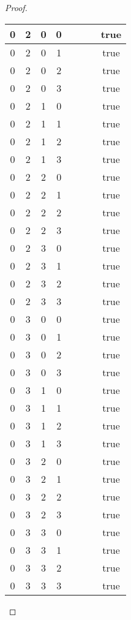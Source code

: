 \documentclass[10pt]{article}
\theoremstyle{definition}
\theoremstyle{plain}
\begin{document}
\begin{proof}
\begin{longtable}{|c|c|c|c|c|c|c|c|}
      0 & 2 & 0 & 0 &  &  &  & true \tabularnewline \hline
      0 & 2 & 0 & 1 &  &  &  & true \tabularnewline \hline
      0 & 2 & 0 & 2 &  &  &  & true \tabularnewline \hline
      0 & 2 & 0 & 3 &  &  &  & true \tabularnewline \hline
      0 & 2 & 1 & 0 &  &  &  & true \tabularnewline \hline
      0 & 2 & 1 & 1 &  &  &  & true \tabularnewline \hline
      0 & 2 & 1 & 2 &  &  &  & true \tabularnewline \hline
      0 & 2 & 1 & 3 &  &  &  & true \tabularnewline \hline
      0 & 2 & 2 & 0 &  &  &  & true \tabularnewline \hline
      0 & 2 & 2 & 1 &  &  &  & true \tabularnewline \hline
      0 & 2 & 2 & 2 &  &  &  & true \tabularnewline \hline
      0 & 2 & 2 & 3 &  &  &  & true \tabularnewline \hline
      0 & 2 & 3 & 0 &  &  &  & true \tabularnewline \hline
      0 & 2 & 3 & 1 &  &  &  & true \tabularnewline \hline
      0 & 2 & 3 & 2 &  &  &  & true \tabularnewline \hline
      0 & 2 & 3 & 3 &  &  &  & true \tabularnewline \hline
      0 & 3 & 0 & 0 &  &  &  & true \tabularnewline \hline
      0 & 3 & 0 & 1 &  &  &  & true \tabularnewline \hline
      0 & 3 & 0 & 2 &  &  &  & true \tabularnewline \hline
      0 & 3 & 0 & 3 &  &  &  & true \tabularnewline \hline
      0 & 3 & 1 & 0 &  &  &  & true \tabularnewline \hline
      0 & 3 & 1 & 1 &  &  &  & true \tabularnewline \hline
      0 & 3 & 1 & 2 &  &  &  & true \tabularnewline \hline
      0 & 3 & 1 & 3 &  &  &  & true \tabularnewline \hline
      0 & 3 & 2 & 0 &  &  &  & true \tabularnewline \hline
      0 & 3 & 2 & 1 &  &  &  & true \tabularnewline \hline
      0 & 3 & 2 & 2 &  &  &  & true \tabularnewline \hline
      0 & 3 & 2 & 3 &  &  &  & true \tabularnewline \hline
      0 & 3 & 3 & 0 &  &  &  & true \tabularnewline \hline
      0 & 3 & 3 & 1 &  &  &  & true \tabularnewline \hline
      0 & 3 & 3 & 2 &  &  &  & true \tabularnewline \hline
      0 & 3 & 3 & 3 &  &  &  & true \tabularnewline \hline


\end{longtable}
\end{proof}
\end{document}
